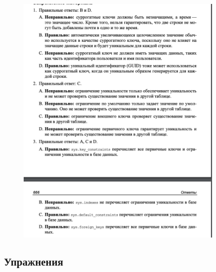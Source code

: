 \begin{figure}[h!]
	\begin{center}
		\includegraphics[width=0.9\textwidth]{img/ans17.png}
	\end{center}
	\captionsetup{justification=centering}
\end{figure}

\newpage
\subsection*{Упражнения}

